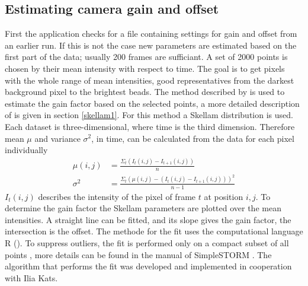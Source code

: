 \subsection{Estimating camera gain and offset}
First the application checks for a file containing settings for gain and offset from an earlier run. If this is not the case new parameters are estimated based on the first part of the data; usually 200 frames are sufficiant.\newline
A set of 2000 points is chosen by their mean intensity with respect to time. The goal is to get pixels with the whole range of mean intensities, good representatives from the darkest background pixel to the brightest beads.\newline 
The method described by \cite{skellam} is used to estimate the
gain factor based on the selected points, a more detailed description of is given in section \ref{skellam1}. For this method a Skellam distribution is used. 
Each dataset is three-dimensional, where time is the third
dimension. Therefore mean $\mu$ and variance $\sigma^2$, in time, can be calculated from
the data for each pixel individually
\begin{align}
	\mu(i,j) & = \frac{\Sigma_t(I_t(i,j)-I_{t+1}(i,j))}{n}\\
	\sigma^2 & = \frac{\Sigma_t(\mu(i,j)-(I_t(i,j)-I_{t+1}(i,j)))^2}{n-1}
\end{align} 
$I_t(i,j)$ describes the intensity of the pixel of frame $t$ at position $i,j$.
To determine the gain factor the Skellam parameters are plotted over the mean
intensities. A straight line can be fitted, and its slope gives the gain
factor, the intersection is the offset.\newline 
The methode for the fit uses the computational language R (\cite{Rcite}). To suppress outliers, the fit is performed only on a compact subset of all points \cite{ilia1}, more details can be found in the manual of SimpleSTORM \cite{ilia2}. The algorithm that performs the fit was developed and implemented in cooperation with Ilia Kats.  
